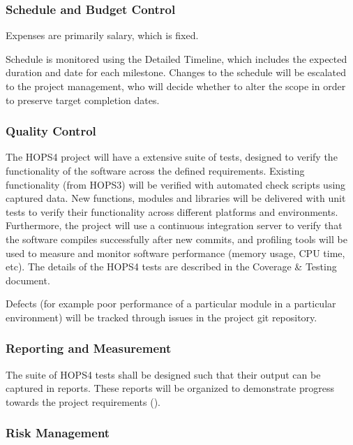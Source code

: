 
\subsubsection{Schedule and Budget Control}

Expenses are primarily salary, which is fixed.

Schedule is monitored using the Detailed Timeline, which includes the expected duration and date for each milestone. Changes to the schedule will be escalated to the project management, who will decide whether to alter the scope in order to preserve target completion dates.

\subsubsection{Quality Control}

The HOPS4 project will have a extensive suite of tests, designed to verify the functionality of the software across the defined requirements. Existing functionality (from HOPS3) will be verified with automated check scripts using captured data.  New functions, modules and libraries will be delivered with unit tests to verify their functionality across different platforms and environments.  Furthermore, the project will use a continuous integration server to verify that the software compiles successfully after new commits, and profiling tools will be used to measure and monitor software performance (memory usage, CPU time, etc).  The details of the HOPS4 tests are described in the Coverage \& Testing document.

Defects (for example poor performance of a particular module in a particular environment) will be tracked through issues in the project git repository. 


\subsubsection{Reporting and Measurement}

The suite of HOPS4 tests shall be designed such that their output can be captured in reports. These reports will be organized to demonstrate progress towards the project requirements (). 

\subsubsection{Risk Management}

